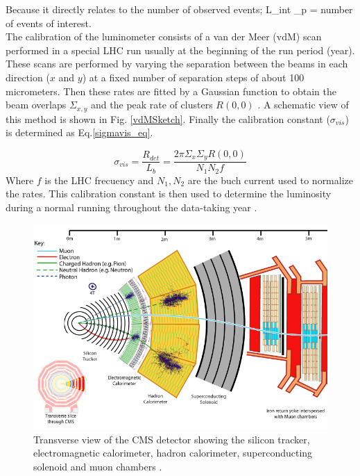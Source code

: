 \documentclass[final,12p]{article}
\begin{document}
Because it directly relates to the number of observed events; L_{int} \dot \sigma_{p} = number of events of interest. \\

The calibration of the luminometer consists of a van der Meer (vdM) scan performed in a special LHC run usually at the beginning of the run period (year).
These scans are performed by varying the separation between the beams in each direction ($x$ and $y$) at a fixed number of separation steps of about 100 micrometers. Then these rates are fitted by a Gaussian function to obtain the beam overlaps $\Sigma_{x,y}$ and the peak rate of clusters $R(0,0)$ \cite{CMS:2018}. A schematic view of this method is shown in Fig. \ref{vdMSketch}. 
Finally the calibration constant ($\sigma_{vis}$) is determined as Eq.\ref{sigmavis_eq}.

\begin{equation}
  \sigma_{vis}=\frac{R_{det}}{L_{b}}=\frac{2\pi \Sigma_{x} \Sigma_{y} R(0, 0)}{N_{1}N_{2} f}
  \label{sigmavis_eq}
\end{equation}
Where $f$  is the LHC frecuency and $N_{1},N_{2}$ are the buch current used to normalize  the rates.
This calibration constant is then used to determine the luminosity during a normal running throughout the data-taking year \cite{CMS:2018}.



\begin{figure}[H]
  \centering
  \includegraphics[width=0.65\columnwidth]{./cms12.png}
  \caption{Transverse view of the CMS detector showing the silicon tracker, electromagnetic calorimeter, hadron calorimeter, superconducting solenoid and muon chambers \cite{Chatrchyan:2008aa}.}
  \label{fig:CMS}
\end{figure}
\end{document}
